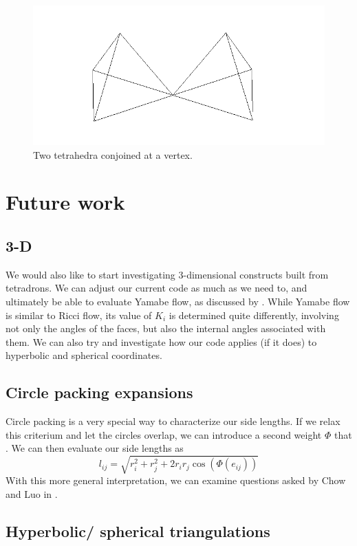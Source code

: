\documentclass[12pt]{article}
\begin{document}
\begin{figure}
\includegraphics{tetratouch.png}
\caption{Two tetrahedra conjoined at a vertex.}
\label{fig:tt}
\end{figure}

\section{Future work}
\subsection{3-D}

We would also like to start investigating 3-dimensional constructs built from tetradrons. We can adjust our current code as much as we need to, and ultimately be able to evaluate Yamabe flow, as discussed by \cite{DrG}. While Yamabe flow is similar to Ricci flow, its value of $K_i$ is determined quite differently, involving not only the angles of the faces, but also the internal angles associated with them. We can also try and investigate how our code applies (if it does) to hyperbolic and spherical coordinates. 

\subsection{Circle packing expansions}

Circle packing is a very special way to characterize our side lengths. If we relax this criterium and let the circles overlap, we can introduce a second weight $\Phi$ that . We can then evaluate our side lengths as $$l_{ij} = \sqrt{r_i^2 + r_j^2 + 2r_ir_j\cos(\Phi(e_{ij}))}$$ With this more general interpretation, we can examine questions asked by Chow and Luo in \cite{chowluo}.  

\subsection{Hyperbolic/ spherical triangulations}
\end{document}
